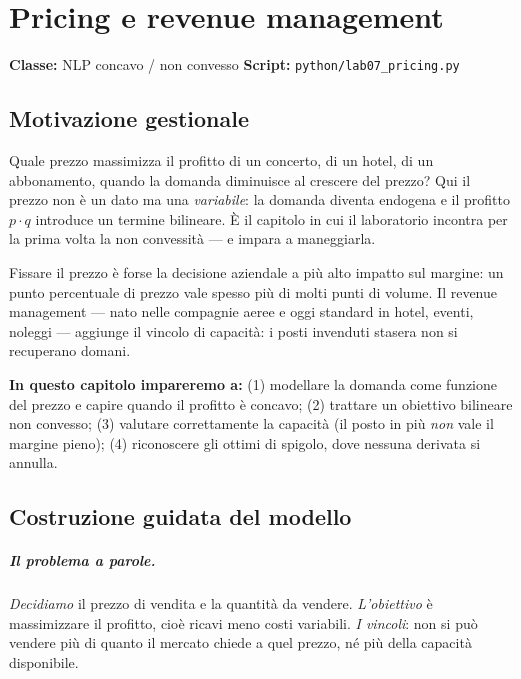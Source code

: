 \chapter{Pricing e revenue management}
\label{cap:pricing}

\noindent\textbf{Classe:} NLP concavo / non convesso \hfill
\textbf{Script:} \texttt{python/lab07\_pricing.py}

\section{Motivazione gestionale}

Quale prezzo massimizza il profitto di un concerto, di un hotel, di un abbonamento,
quando la domanda diminuisce al crescere del prezzo? Qui il prezzo non è un dato ma
una \emph{variabile}: la domanda diventa endogena e il profitto $p \cdot q$ introduce
un termine bilineare. È il capitolo in cui il laboratorio incontra per la prima volta
la non convessità --- e impara a maneggiarla.



Fissare il prezzo è forse la decisione aziendale a più alto impatto sul margine: un
punto percentuale di prezzo vale spesso più di molti punti di volume. Il revenue
management --- nato nelle compagnie aeree e oggi standard in hotel, eventi,
noleggi --- aggiunge il vincolo di capacità: i posti invenduti stasera non si
recuperano domani.

\textbf{In questo capitolo impareremo a:} (1) modellare la domanda come funzione
del prezzo e capire quando il profitto è concavo; (2) trattare un obiettivo
bilineare non convesso; (3) valutare correttamente la capacità (il posto in più
\emph{non} vale il margine pieno); (4) riconoscere gli ottimi di spigolo, dove
nessuna derivata si annulla.

\section{Costruzione guidata del modello}

\paragraph{Il problema a parole.} \emph{Decidiamo} il prezzo di vendita e la
quantità da vendere. \emph{L'obiettivo} è massimizzare il profitto, cioè ricavi meno
costi variabili. \emph{I vincoli}: non si può vendere più di quanto il mercato chiede
a quel prezzo, né più della capacità disponibile.

